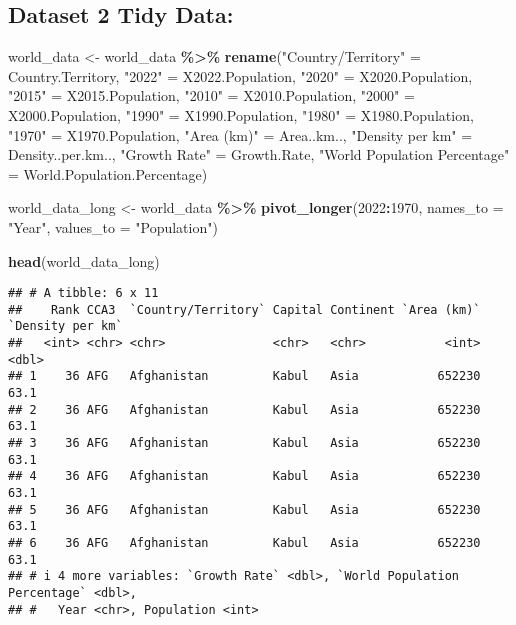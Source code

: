 \documentclass[
]{article}
\newenvironment{Shaded}{\begin{snugshade}}{\end{snugshade}}
\newcommand{\AttributeTok}[1]{\textcolor[rgb]{0.13,0.29,0.53}{#1}}
\newcommand{\FunctionTok}[1]{\textcolor[rgb]{0.13,0.29,0.53}{\textbf{#1}}}
\newcommand{\NormalTok}[1]{#1}
\newcommand{\OtherTok}[1]{\textcolor[rgb]{0.56,0.35,0.01}{#1}}
\newcommand{\SpecialCharTok}[1]{\textcolor[rgb]{0.81,0.36,0.00}{\textbf{#1}}}
\newcommand{\StringTok}[1]{\textcolor[rgb]{0.31,0.60,0.02}{#1}}
\begin{document}
\subsection{Dataset 2 Tidy Data:}\label{dataset-2-tidy-data}

\begin{Shaded}
\begin{Highlighting}[]
\NormalTok{world\_data }\OtherTok{\textless{}{-}}\NormalTok{ world\_data }\SpecialCharTok{\%\textgreater{}\%}
  \FunctionTok{rename}\NormalTok{(}\StringTok{"Country/Territory"} \OtherTok{=}\NormalTok{ Country.Territory, }\StringTok{"2022"} \OtherTok{=}\NormalTok{ X2022.Population, }\StringTok{"2020"} \OtherTok{=}\NormalTok{ X2020.Population, }\StringTok{"2015"} \OtherTok{=}\NormalTok{ X2015.Population, }\StringTok{"2010"} \OtherTok{=}\NormalTok{ X2010.Population, }\StringTok{"2000"} \OtherTok{=}\NormalTok{ X2000.Population, }\StringTok{"1990"} \OtherTok{=}\NormalTok{ X1990.Population, }\StringTok{"1980"} \OtherTok{=}\NormalTok{ X1980.Population, }\StringTok{"1970"} \OtherTok{=}\NormalTok{ X1970.Population, }\StringTok{"Area (km)"} \OtherTok{=}\NormalTok{ Area..km.., }\StringTok{"Density per km"} \OtherTok{=}\NormalTok{ Density..per.km.., }\StringTok{"Growth Rate"} \OtherTok{=}\NormalTok{ Growth.Rate, }\StringTok{"World Population Percentage"} \OtherTok{=}\NormalTok{ World.Population.Percentage)}

\NormalTok{world\_data\_long }\OtherTok{\textless{}{-}}\NormalTok{ world\_data }\SpecialCharTok{\%\textgreater{}\%}
  \FunctionTok{pivot\_longer}\NormalTok{(}\StringTok{\textasciigrave{}}\AttributeTok{2022}\StringTok{\textasciigrave{}}\SpecialCharTok{:}\StringTok{\textasciigrave{}}\AttributeTok{1970}\StringTok{\textasciigrave{}}\NormalTok{, }\AttributeTok{names\_to =} \StringTok{"Year"}\NormalTok{, }\AttributeTok{values\_to =} \StringTok{"Population"}\NormalTok{)}

\FunctionTok{head}\NormalTok{(world\_data\_long)}
\end{Highlighting}
\end{Shaded}

\begin{verbatim}
## # A tibble: 6 x 11
##    Rank CCA3  `Country/Territory` Capital Continent `Area (km)` `Density per km`
##   <int> <chr> <chr>               <chr>   <chr>           <int>            <dbl>
## 1    36 AFG   Afghanistan         Kabul   Asia           652230             63.1
## 2    36 AFG   Afghanistan         Kabul   Asia           652230             63.1
## 3    36 AFG   Afghanistan         Kabul   Asia           652230             63.1
## 4    36 AFG   Afghanistan         Kabul   Asia           652230             63.1
## 5    36 AFG   Afghanistan         Kabul   Asia           652230             63.1
## 6    36 AFG   Afghanistan         Kabul   Asia           652230             63.1
## # i 4 more variables: `Growth Rate` <dbl>, `World Population Percentage` <dbl>,
## #   Year <chr>, Population <int>
\end{verbatim}
\end{document}
